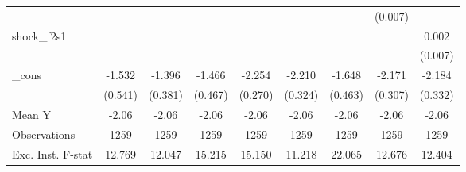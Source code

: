 {\begin{tabular}{l*{8}{c}}
            &                     &                     &                     &                     &                     &                     &     (0.007)         &                     \\
\addlinespace
shock\_f2s1  &                     &                     &                     &                     &                     &                     &                     &       0.002         \\
            &                     &                     &                     &                     &                     &                     &                     &     (0.007)         \\
\addlinespace
\_cons      &      -1.532\sym{***}&      -1.396\sym{***}&      -1.466\sym{***}&      -2.254\sym{***}&      -2.210\sym{***}&      -1.648\sym{***}&      -2.171\sym{***}&      -2.184\sym{***}\\
            &     (0.541)         &     (0.381)         &     (0.467)         &     (0.270)         &     (0.324)         &     (0.463)         &     (0.307)         &     (0.332)         \\
\midrule
Mean Y      &       -2.06         &       -2.06         &       -2.06         &       -2.06         &       -2.06         &       -2.06         &       -2.06         &       -2.06         \\
Observations&        1259         &        1259         &        1259         &        1259         &        1259         &        1259         &        1259         &        1259         \\
Exc. Inst. F-stat&      12.769         &      12.047         &      15.215         &      15.150         &      11.218         &      22.065         &      12.676         &      12.404         \\
\bottomrule
\end{tabular}
}
